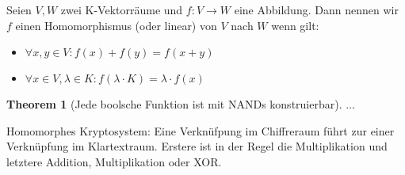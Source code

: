 \begin{theorem}[Homomorphismus]
	Seien $V,W$ zwei K-Vektorräume und $f:V\rightarrow W$ eine Abbildung. Dann nennen wir $f$ einen Homomorphismus (oder linear) von $V$ nach $W$ wenn gilt:
	\begin{itemize}
		\item $\forall x,y\in V : f(x)+f(y) = f(x+y)$
		\item $\forall x\in V, \lambda\in K: f(\lambda\cdot K)=\lambda\cdot f(x)$
	\end{itemize}
\end{theorem}

\newtheorem{theorem2}{Theorem}[section]
\begin{theorem2}[Jede boolsche Funktion ist mit NANDs konstruierbar]
	$\ldots$
\end{theorem2}

Homomorphes Kryptosystem:
Eine Verknüfpung im Chiffreraum führt zur einer Verknüpfung im Klartextraum. Erstere ist in der Regel die Multiplikation und letztere Addition, Multiplikation oder XOR.